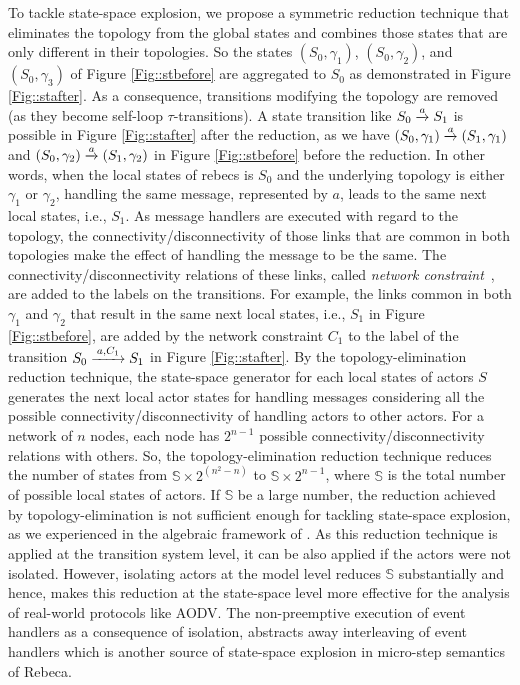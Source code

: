To tackle state-space explosion, we propose a symmetric reduction technique that eliminates the topology from the global states and combines those states that are only different in their topologies.  So the states $(S_0,\gamma_1)$, $(S_0,\gamma_2)$, and $(S_0,\gamma_3)$ of Figure \ref{Fig::stbefore} are aggregated to $S_0$ as demonstrated in Figure \ref{Fig::stafter}. As a consequence, transitions modifying the topology are removed (as they become self-loop $\tau$-transitions). 
A state transition like $S_0\overto{a} S_1$ is possible in Figure \ref{Fig::stafter} after the reduction, as we have $(S_0,\gamma_1)\overto{a}(S_1,\gamma_1)$ and $(S_0,\gamma_2)\overto{a}(S_1,\gamma_2)$ in Figure \ref{Fig::stbefore} before the reduction. In other words, when the local states of rebecs is $S_0$ and the underlying topology is either $\gamma_1$ or $\gamma_2$, handling the same message, represented by $a$, leads to the same next local states, i.e., $S_1$.  As message handlers are executed with regard to the topology, the connectivity/disconnectivity of those links that are common in both topologies make the effect of handling the message to be the same. The connectivity/disconnectivity relations of these links, called \emph{network constraint}~\cite{FatemehFI10,FatemehFI19},  are added to the labels on the transitions. For example, the links common in both $\gamma_{1}$ and $\gamma_{2}$ that result in the same next local states, i.e., $S_1$ in Figure \ref{Fig::stbefore}, are added by the network constraint $C_1$ to the label of the transition $S_0\overto{a,C_1}S_1$ in Figure \ref{Fig::stafter}. %
By the topology-elimination reduction technique, the state-space generator for each local states of actors $S$ %
generates the next local actor states for handling messages
considering all the possible connectivity/disconnectivity of handling actors to other actors. For a network of $n$ nodes, each node has $2^{n-1}$ possible connectivity/disconnectivity relations with others. So, the topology-elimination reduction technique reduces the number of states from $\mathbb{S}\times 2^{(n^2-n)}$ to $\mathbb{S}\times2^{n-1}$, where $\mathbb{S}$ is the total number of possible local states of actors. If $\mathbb{S}$ be a large number, the reduction achieved by topology-elimination is not sufficient enough for tackling state-space explosion, as we experienced in the algebraic framework of \cite{FORM}. As this reduction technique is applied at the transition system level, it can be also applied if the actors were not isolated. However, isolating actors at the model level reduces $\mathbb{S}$ substantially and hence, makes this reduction at the state-space level more effective for the analysis of real-world protocols like AODV. The non-preemptive execution of event handlers as a consequence of isolation, abstracts away interleaving of event handlers which is another source of state-space explosion in micro-step semantics of Rebeca. 

